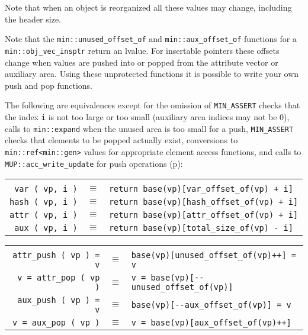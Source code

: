 \documentclass[12pt]{article}
\newcommand{\pagref}[1]{p\pageref{#1}}
\newcommand{\EOL}{\penalty \exhyphenpenalty}
\newenvironment{indpar}[1][0.3in]%
	{\begin{list}{}%
		     {\setlength{\itemsep}{0in}%
		      \setlength{\topsep}{0in}%
		      \setlength{\parsep}{1ex}%
		      \setlength{\labelwidth}{#1}%
		      \setlength{\leftmargin}{#1}%
		      \addtolength{\leftmargin}{\labelsep}}%
	 \item}%
	{\end{list}}
\begin{document}
Note that when an object is reorganized all these values may
change, including the header size.

Note that the {\tt min::\EOL unused\_\EOL offset\_\EOL of} and
{\tt min::\EOL aux\_\EOL offset\_\EOL of} functions for a
{\tt min::\EOL obj\_\EOL vec\_\EOL insptr} return an
lvalue.  For insertable pointers these offsets change when
values are pushed into or popped from the attribute vector or
auxiliary area.  Using these unprotected functions it is possible
to write your own push and pop functions.

The following are equivalences except for
the omission of {\tt MIN\_\EOL ASSERT} checks that the index \verb|i|
is not too large or too small (auxiliary area indices may not be 0),
calls to {\tt min::\EOL expand} when the unused area is too small
for a push, {\tt MIN\_\EOL ASSERT} checks that elements to be popped
actually exist,
conversions to \verb|min::ref<min::gen>|
values for appropriate element access functions, and
calls to {\tt MUP::\EOL acc\_\EOL write\_\EOL update}
for push operations
(\pagref{MUP::ACC_WRITE_GEN_UPDATE}):

\begin{indpar}\begin{tabular}{rcl}
\hspace*{2.0in} \\[-3ex]
\verb|var ( vp, i )| & $\equiv$
    & \verb|return base(vp)[var_offset_of(vp) + i]| \\
\verb|hash ( vp, i )| & $\equiv$
    & \verb|return base(vp)[hash_offset_of(vp) + i]| \\
\verb|attr ( vp, i )| & $\equiv$
    & \verb|return base(vp)[attr_offset_of(vp) + i]| \\
\verb|aux ( vp, i )| & $\equiv$
    & \verb|return base(vp)[total_size_of(vp) - i]| \\
\end{tabular}\end{indpar}\label{OBJECT-VECTOR-EQUIVALENTS}
\begin{indpar}\begin{tabular}{rcl}
\hspace*{2.0in} \\[-3ex]
\verb|attr_push ( vp ) = v| & $\equiv$
    & \verb|base(vp)[unused_offset_of(vp)++] = v| \\
\verb|v = attr_pop ( vp )| & $\equiv$
    & \verb|v = base(vp)[--unused_offset_of(vp)]| \\
\verb|aux_push ( vp ) = v| & $\equiv$
    & \verb|base(vp)[--aux_offset_of(vp)] = v| \\
\verb|v = aux_pop ( vp )| & $\equiv$
    & \verb|v = base(vp)[aux_offset_of(vp)++]| \\
\end{tabular}\end{indpar}
\end{document}
